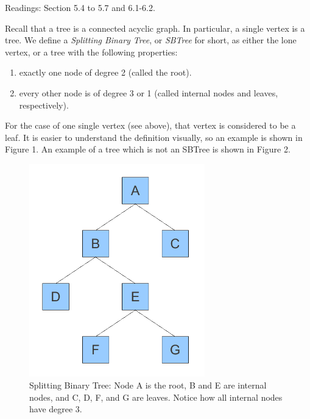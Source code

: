 \documentclass[12pt,twoside]{article}
\begin{document}
Readings: Section 5.4 to 5.7 and 6.1-6.2.

\begin{problem}{20}
Recall that a tree is a connected acyclic graph.  In particular, a single vertex is a tree.  We define a \emph{Splitting Binary Tree}, or \emph{SBTree} for short, as either the lone vertex, or a tree with the following properties:

\begin{enumerate}
\item  exactly one node of degree 2 (called the root).
\item  every other node is of degree 3 or 1 (called internal nodes and leaves, respectively).
\end{enumerate}

For the case of one single vertex (see above), that vertex is considered to be a leaf.  It is easier to understand the definition visually, so an example is shown in Figure 1. An example of a tree which is not an SBTree is shown in Figure 2.

\begin{figure}[p]
\label{split}
\centerline{\includegraphics[width = 3.00in]{splittingTree}}
\caption{Splitting Binary Tree: Node A is the root, B and E are internal nodes, and C, D,  F, and G are leaves.  Notice how all internal nodes have degree $3$.}
\end{figure}



\end{problem}
\end{document}
